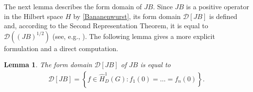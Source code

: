 \documentclass{article}
\numberwithin{equation}{section}
\newtheorem{lemma}[theorem]{Lemma}
\theoremstyle{definition}
\newcommand{\mD}{\mathcal{D}}
\newcommand{\AKone}{B}
\begin{document}
The next lemma describes the form domain of $J\AKone$. Since $J\AKone$ is a positive operator in the Hilbert space $H$ by \eqref{Bananenwurst}, its form domain $\mD[J\AKone]$ is defined and, according to the Second Representation Theorem, it is equal to $\mD\left((J\AKone)^{1/2}\right)$ (see, e.g., \cite[VI-§ 2.6]{K}). The following lemma gives a more explicit formulation and a direct computation.

\begin{lemma}
   \label{lemma:form_domain}
   The form domain $\mD[J\AKone]$ of $J\AKone$ is equal to
   \begin{align}
      \label{eq:formdomainAone}
      \mD[J\AKone] = \left\{ f\in \widehat H^1_D(G)  : f_1(0) = \dots = f_n(0) \right\}.
   \end{align}
\end{lemma}
\end{document}

